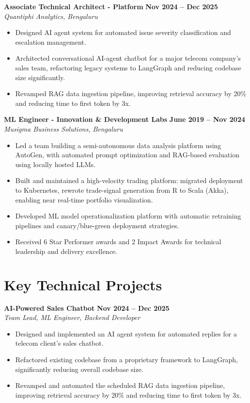 \documentclass[11pt]{article}
\begin{document}
\textbf{Associate Technical Architect - Platform} \hfill \textbf{Nov 2024 -- Dec 2025} \\
\textit{Quantiphi Analytics, Bengaluru}
\begin{itemize}[leftmargin=*, nosep]
\item Designed AI agent system for automated issue severity classification and escalation management.
\item Architected conversational AI-agent chatbot for a major telecom company's sales team, refactoring legacy systems to LangGraph and reducing codebase size significantly.
\item Revamped RAG data ingestion pipeline, improving retrieval accuracy by 20\% and reducing time to first token by 3x.
\end{itemize}

\textbf{ML Engineer - Innovation \& Development Labs} \hfill \textbf{June 2019 -- Nov 2024} \\
\textit{Musigma Business Solutions, Bengaluru}
\begin{itemize}[leftmargin=*, nosep]
\item Led a team building a semi-autonomous data analysis platform using AutoGen, with automated prompt optimization and RAG-based evaluation using locally hosted LLMs.
\item Built and maintained a high-velocity trading platform: migrated deployment to Kubernetes, rewrote trade-signal generation from R to Scala (Akka), enabling near real-time portfolio visualization.
\item Developed ML model operationalization platform with automatic retraining pipelines and canary/blue-green deployment strategies.
\item Received 6 Star Performer awards and 2 Impact Awards for technical leadership and delivery excellence.
\end{itemize}

\section{Key Technical Projects}

\textbf{AI-Powered Sales Chatbot} \hfill \textbf{Nov 2024 -- Dec 2025} \\
\textit{Team Lead, ML Engineer, Backend Developer}
\begin{itemize}[leftmargin=*, nosep]
\item Designed and implemented an AI agent system for automated replies for a telecom client's sales chatbot.
\item Refactored existing codebase from a proprietary framework to LangGraph, significantly reducing overall codebase size.
\item Revamped and automated the scheduled RAG data ingestion pipeline, improving retrieval accuracy by 20\% and reducing time to first token by 3x.
\end{itemize}
\end{document}
